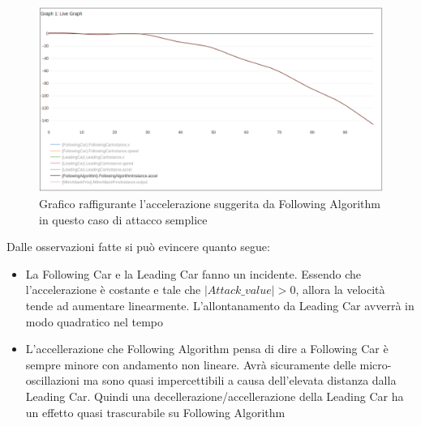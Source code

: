 \begin{figure}[H]
	\centering
	\includegraphics[width=\textwidth]{img/AttackAccel1AccelAlgo.png}
	\caption{Grafico raffigurante l'accelerazione suggerita da Following Algorithm in questo caso di attacco semplice}
\end{figure}

Dalle osservazioni fatte si può evincere quanto segue:
\begin{itemize}
	\item La Following Car e la Leading Car fanno un incidente. Essendo che l'accelerazione è costante e tale che $ |Attack\_value| > 0 $, allora la velocità tende ad aumentare linearmente. L'allontanamento da Leading Car avverrà in modo quadratico nel tempo
	\item L'accellerazione che Following Algorithm pensa di dire a Following Car è sempre minore con andamento non lineare. Avrà sicuramente delle micro-oscillazioni ma sono quasi impercettibili a causa dell'elevata distanza dalla Leading Car. Quindi una decellerazione/accellerazione della Leading Car ha un effetto quasi trascurabile su Following Algorithm
\end{itemize}

